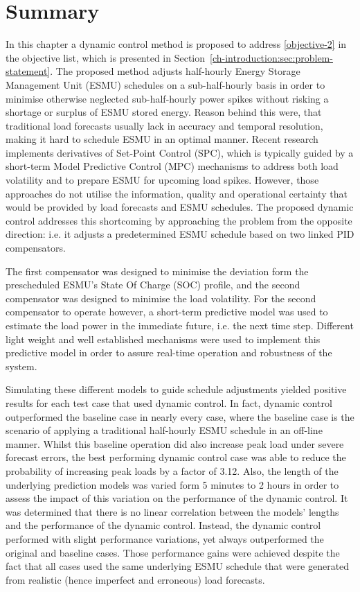 \section{Summary}
\label{ch2:sec:summary}

In this chapter a dynamic control method is proposed to address \ref{objective-2} in the objective list, which is presented in Section~\ref{ch-introduction:sec:problem-statement}.
The proposed method adjusts half-hourly Energy Storage Management Unit (ESMU) schedules on a sub-half-hourly basis in order to minimise otherwise neglected sub-half-hourly power spikes without risking a shortage or surplus of ESMU stored energy.
Reason behind this were, that traditional load forecasts usually lack in accuracy and temporal resolution, making it hard to schedule ESMU in an optimal manner.
Recent research implements derivatives of Set-Point Control (SPC), which is typically guided by a short-term Model Predictive Control (MPC) mechanisms to address both load volatility and to prepare ESMU for upcoming load spikes.
However, those approaches do not utilise the information, quality and operational certainty that would be provided by load forecasts and ESMU schedules.
The proposed dynamic control addresses this shortcoming by approaching the problem from the opposite direction: i.e. it adjusts a predetermined ESMU schedule based on two linked PID compensators.

The first compensator was designed to minimise the deviation form the prescheduled ESMU's State Of Charge (SOC) profile, and the second compensator was designed to minimise the load volatility.
For the second compensator to operate however, a short-term predictive model was used to estimate the load power in the immediate future, i.e. the next time step.
Different light weight and well established mechanisms were used to implement this predictive model in order to assure real-time operation and robustness of the system.

Simulating these different models to guide schedule adjustments yielded positive results for each test case that used dynamic control.
In fact, dynamic control outperformed the baseline case in nearly every case, where the baseline case is the scenario of applying a traditional half-hourly ESMU schedule in an off-line manner.
Whilst this baseline operation did also increase peak load under severe forecast errors, the best performing dynamic control case was able to reduce the probability of increasing peak loads by a factor of 3.12.
Also, the length of the underlying prediction models was varied form 5 minutes to 2 hours in order to assess the impact of this variation on the performance of the dynamic control.
It was determined that there is no linear correlation between the models' lengths and the performance of the dynamic control.
Instead, the dynamic control performed with slight performance variations, yet always outperformed the original and baseline cases.
Those performance gains were achieved despite the fact that all cases used the same underlying ESMU schedule that were generated from realistic (hence imperfect and erroneous) load forecasts.

